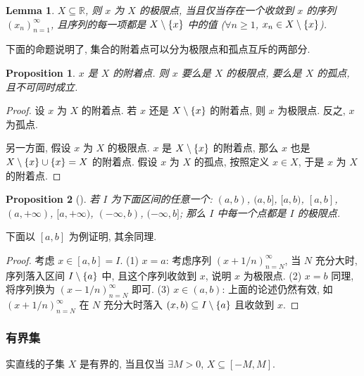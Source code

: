 \documentclass[UTF8]{ctexart}
\theoremstyle{mystyle}
\newtheorem{lemma}{Lemma}[section]
\newtheorem{proposition}{Proposition}[section]
\theoremstyle{myremark}
\theoremstyle{plain}
\newcommand{\R}{\mathbb R}
\DeclarePairedDelimiter\set{\{}{\}}
\begin{document}
\begin{lemma}
    $ X \subseteq \R $, 则 $ x $ 为 $ X $ 的极限点, 当且仅当存在一个收敛到 $ x $ 的序列 $ (x_n)_{n = 1}^\infty $, 且序列的每一项都是 $ X \setminus \set{x} $ 中的值 ($ \forall n \geqslant 1 $, $ x_n \in X \setminus \set{x} $).
\end{lemma}

下面的命题说明了, 集合的附着点可以分为极限点和孤点互斥的两部分.
\begin{proposition}
    $ x $ 是 $ X $ 的附着点. 则 $ x $ 要么是 $ X $ 的极限点, 要么是 $ X $ 的孤点, 且不可同时成立.
\end{proposition}

\begin{proof}
    设 $ x $ 为 $ X $ 的附着点. 若 $ x $ 还是 $ X \setminus \set{x} $ 的附着点, 则 $ x $ 为极限点. 反之, $ x $ 为孤点.

    另一方面, 假设 $ x $ 为 $ X $ 的极限点. $ x $ 是 $ X \setminus \set{x} $ 的附着点, 那么 $ x $ 也是 $ X \setminus \set{x} \cup \set{x} = X $ 的附着点. 假设 $ x $ 为 $ X $ 的孤点, 按照定义 $ x \in X $, 于是 $ x $ 为 $ X $ 的附着点.
\end{proof}

\begin{proposition}[]
    若 $ I $ 为下面区间的任意一个: $ (a, b) $, $ (a, b] $, $ [a, b) $, $ [a, b] $, $ (a, +\infty) $, $ [a, +\infty) $, $ (-\infty, b) $, $ (-\infty, b] $; 那么 $ I $ 中每一个点都是 $ I $ 的极限点.
\end{proposition}

下面以 $ [a, b] $ 为例证明, 其余同理.

\begin{proof}
    考虑 $ x \in [a, b] = I $. (1) $ x = a $: 考虑序列 $ (x + 1/n)_{n = N}^\infty $, 当 $ N $ 充分大时, 序列落入区间 $ I \setminus \set{a} $ 中, 且这个序列收敛到 $ x $, 说明 $ x $ 为极限点. (2) $ x = b $ 同理, 将序列换为 $ (x - 1/n)_{n = N}^\infty $ 即可. (3) $ x \in (a, b) $: 上面的论述仍然有效, 如 $ (x + 1/n)_{n = N}^\infty $ 在 $ N $ 充分大时落入 $ (x, b) \subseteq I \setminus \set{a} $ 且收敛到 $ x $.
\end{proof}


\subsubsection{有界集}
\begin{definition}[\text{有界}]
    实直线的子集 $ X $ 是有界的, 当且仅当 $ \exists M > 0 $, $ X \subseteq [-M, M] $.
\end{definition}
\end{document}
